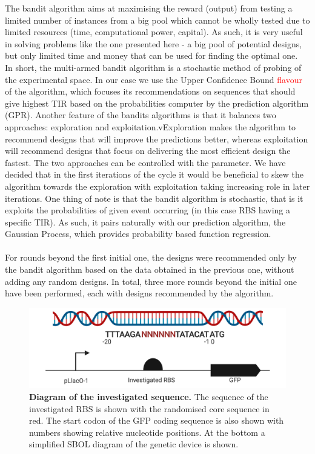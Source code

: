 \documentclass{article}
\begin{document}
The bandit algorithm aims at maximising the reward (output) from testing a limited number of instances from a big pool which cannot be wholly tested due to limited resources (time, computational power, capital). As such, it is very useful in solving problems like the one presented here - a big pool of potential designs, but only limited time and money that can be used for finding the optimal one.\\
In short, the multi-armed bandit algorithm is a stochastic method of probing of the experimental space. In our case we use the Upper Confidence Bound \textcolor{red}{flavour} of the algorithm, which focuses its recommendations on sequences that should give highest TIR based on the probabilities computer by the prediction algorithm (GPR). Another feature of the bandits algorithms is that it balances two approaches: exploration and exploitation.vExploration makes the algorithm to recommend designs that will improve the predictions better, whereas exploitation will recommend designs that focus on delivering the most efficient design the fastest. The two approaches can be controlled with the \textbeta\enspace parameter. We have decided that in the first iterations of the cycle it would be beneficial to skew the algorithm towards the exploration with exploitation taking increasing role in later iterations. One thing of note is that the bandit algorithm is stochastic, that is it exploits the probabilities of given event occurring (in this case RBS having a specific TIR). As such, it pairs naturally with our prediction algorithm, the Gaussian Process, which provides probability based function regression.\\
\\
For rounds beyond the first initial one, the designs were recommended only by the bandit algorithm based on the data obtained in the previous one, without adding any random designs. In total, three more rounds beyond the initial one have been performed, each with designs recommended by the algorithm. 

\begin{figure}[t]
    \centering
    \includegraphics[scale=0.6]{plots/RBS_anatomy.pdf}
    \caption{\textbf{Diagram of the investigated sequence.} The sequence of the investigated RBS is shown with the randomised core sequence in red. The start codon of the GFP coding sequence is also shown with numbers showing relative nucleotide positions. At the bottom a simplified SBOL diagram of the genetic device is shown.}
    \label{fig: Anatomy of the randomized sequence.}
\end{figure}
\end{document}
